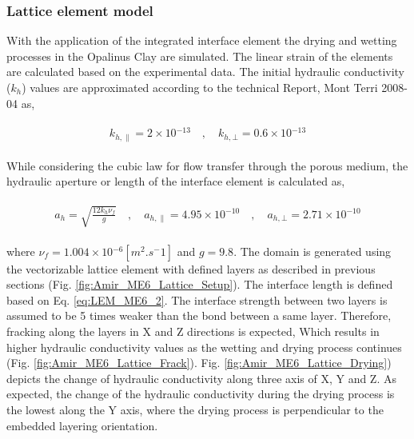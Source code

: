 \subsubsection*{Lattice element model}

With the application of the integrated interface element \cite{Sattarietal2019b} the drying and wetting processes in the Opalinus Clay are simulated. The linear strain of the elements are calculated based on the experimental data. The initial hydraulic conductivity ($k_h$) values are approximated according to the technical Report, Mont Terri 2008-04 as,

\begin{align}
\label{eq:LEM_ME6_1}
\begin{split}
k_{h,\parallel}=2\times{10}{^{-13}}
\quad , \quad
k_{h,\bot}=0.6\times{10}{^{-13}}
\end{split}
\end{align}

While considering the cubic law for flow transfer through the porous medium, the hydraulic aperture or length of the interface element is calculated as,

\begin{align}
\label{eq:LEM_ME6_2}
\begin{split}
a_h=\sqrt{\frac{12k_h\nu_f}{g}}
\quad , \quad
a_{h,\parallel}=4.95\times{10}{^{-10}}
\quad , \quad
a_{h,\bot}=2.71\times{10}{^{-10}}
\end{split}
\end{align}

where $\nu_f=1.004\times{10}{^{-6} [m^2.s^-1]}$ and $g=9.8$. The domain is generated using the vectorizable lattice element with defined layers as described in previous sections (Fig. \ref{fig:Amir_ME6_Lattice_Setup}). The interface length is defined based on Eq. \ref{eq:LEM_ME6_2}. The interface strength between two layers is assumed to be 5 times weaker than the bond between a same layer. Therefore, fracking along the layers in X and Z directions is expected, Which results in higher hydraulic conductivity values as the wetting and drying process continues (Fig. \ref{fig:Amir_ME6_Lattice_Frack}). Fig. \ref{fig:Amir_ME6_Lattice_Drying}) depicts the change of hydraulic conductivity along three axis of X, Y and Z. As expected, the change of the hydraulic conductivity during the drying process is the lowest along the Y axis, where the drying process is perpendicular to the embedded layering orientation. 

